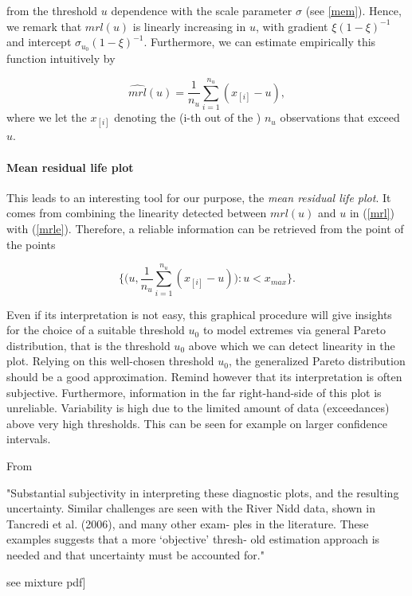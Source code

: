 from the threshold $u$ dependence with the scale parameter $\sigma$ (see \ref{mem}). Hence, we remark that $mrl(u)$ is linearly increasing in $u$, with gradient $\xi(1-\xi)^{-1}$ and intercept $\sigma_{u_0}(1-\xi)^{-1}$. Furthermore, we can estimate empirically this function intuitively by 

\begin{equation}\label{mrle}
\widehat{mrl}(u)=\frac{1}{n_u}\sum_{i=1}^{n_u}(x_{[i]}-u),
\end{equation}
where we let the $x_{[i]}$ denoting the (i-th out of the ) $n_u$ observations that exceed $u$.

\paragraph*{Mean residual life plot} This leads to an interesting tool for our purpose, the \emph{mean residual life plot}. It comes from combining the linearity detected between $mrl(u)$ and $u$ in (\ref{mrl}) with (\ref{mrle}). Therefore, a reliable information can be retrieved from the point of the points 

\begin{equation}
\Bigg\{\bigg(u,\frac{1}{n_u}\sum_{i=1}^{n_u}(x_{[i]}-u)\bigg):u<x_{max}\Bigg\}.
\end{equation}

Even if its interpretation is not easy, this graphical procedure will give insights for the choice of a suitable threshold $u_0$ to model extremes via general Pareto distribution, that is the threshold $u_0$ above which we can detect linearity in the plot. Relying on this well-chosen threshold $u_0$, the generalized Pareto distribution should be a good approximation.
Remind however that its interpretation is often subjective. Furthermore, information in the far right-hand-side of this plot is unreliable. Variability is high due to the limited amount of data (exceedances) above very high thresholds. This can be seen for example on larger confidence intervals.

From \cite[pp.83-84]{coles_introduction_2001} 


"Substantial subjectivity in interpreting these
diagnostic plots, and the resulting uncertainty. Similar challenges are seen with
the River Nidd data, shown in Tancredi et al. (2006), and many other exam-
ples in the literature. These examples suggests that a more ‘objective’ thresh-
old estimation approach is needed and that uncertainty must be accounted for."

see mixture pdf]



